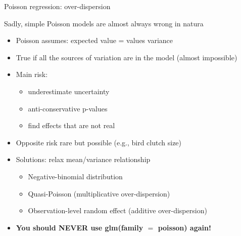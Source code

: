 \documentclass[10pt]{beamer}\usepackage[]{graphicx}\usepackage[]{color}
\begin{document}
\begin{frame}[fragile]{Poisson regression: over-dispersion}
  \begin{alertblock}{Sadly, simple Poisson models are almost always wrong in natura}
    \begin{itemize}[<+->]
      \item Poisson assumes: expected value = values variance
      \item True if all the sources of variation are in the model (almost impossible)
      \item Main risk:
        \begin{itemize}
          \item underestimate uncertainty 
          \item anti-conservative p-values
          \item find effects that are not real
        \end{itemize}
      \item Opposite risk rare but possible (e.g., bird clutch size)
      \item Solutions: relax mean/variance relationship
        \begin{itemize}
          \item Negative-binomial distribution 
          \item Quasi-Poisson (multiplicative over-dispersion)
          \item Observation-level random effect (additive over-dispersion)
        \end{itemize}
      \item \textbf{You should NEVER use glm(family $=$ poisson) again!}
    \end{itemize}
  \end{alertblock}
  
\end{frame}
\end{document}
